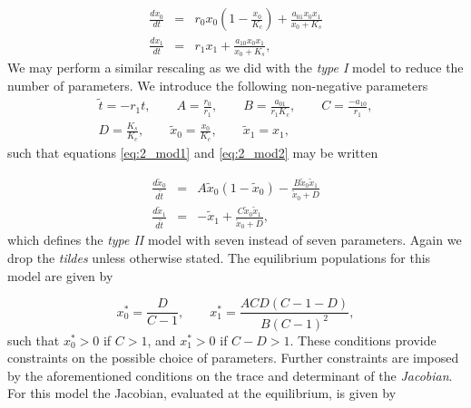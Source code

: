\begin{eqnarray}
\frac{dx_{0}}{dt} &=& r_0x_0\left(1-\frac{x_0}{K_c}\right) + \frac{a_{01}x_0x_1}{x_0 + K_s} \label{eq:2_mod1} \\[10pt]
\frac{dx_{1}}{dt} &=& r_1x_1 + \frac{a_{10}x_0x_1}{x_0 + K_s} \label{eq:2_mod2}, 
\end{eqnarray}
%
We may perform a similar rescaling as we did with the \emph{type I} model to reduce the number of parameters. We introduce the following non-negative parameters
\begin{eqnarray}
\tilde{t} = -r_1 t, \qquad A = \frac{r_0}{r_1},  \qquad B = \frac{a_{01}}{r_1K_c}, \qquad C = \frac{-a_{10}}{r_1}, \\[10pt]
D = \frac{K_s}{K_c}, \qquad  \tilde{x}_0 = \frac{x_0}{K_c}, \qquad \tilde{x}_1 = x_1,
\end{eqnarray}
%
such that equations \eqref{eq:2_mod1} and \eqref{eq:2_mod2} may be written

\begin{eqnarray}
\frac{d\tilde{x}_{0}}{d\tilde{t}} &=& A\tilde{x}_0(1-\tilde{x}_0) - \frac{B\tilde{x}_0\tilde{x}_1}{\tilde{x}_0 + D} \label{eq:hol_mod1} \\[10pt]
\frac{d\tilde{x}_{1}}{d\tilde{t}} &=& -\tilde{x}_1 + \frac{C\tilde{x}_0\tilde{x}_1}{\tilde{x}_0 + D} \label{eq:hol_mod2}, 
\end{eqnarray}
%
which defines the \emph{type II} model with seven instead of seven parameters. Again we drop the \emph{tildes} unless otherwise stated. The equilibrium populations for this model are given by

\begin{equation}\label{eq:hol_mod_eq}
x_{0}^{*} = \frac{D}{C-1},
\qquad 
x_{1}^{*} = \frac{ACD(C-1-D)}{B(C-1)^2} , 
\end{equation}
%
such that $x_0^* > 0 $ if $C > 1$, and $x_1^* > 0 $ if $C - D > 1$. These conditions provide constraints on the possible choice of parameters. Further constraints are imposed by the aforementioned conditions on the trace and determinant of the \emph{Jacobian}. For this model the Jacobian, evaluated at the equilibrium, is given by

